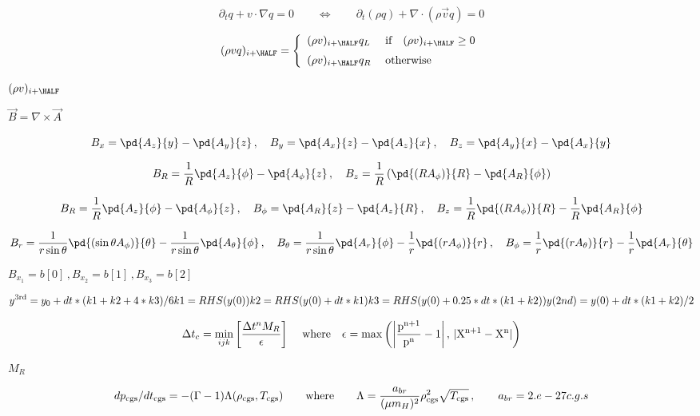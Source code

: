 \documentclass{article}
\begin{document}
\[ \partial_tq + v\cdot \nabla q = 0 
    \qquad\Longleftrightarrow\qquad
    \partial_t(\rho q) + \nabla\cdot(\rho\vec{v}q) = 0 
\]
\pagebreak

\[  (\rho vq)_{i+\HALF} = \left\{\begin{array}{ll}
  (\rho v)_{i+\HALF}q_L & \;\textrm{if} 
         \quad (\rho v)_{i+\HALF} \ge 0 \\ \noalign{\medskip}
  (\rho v)_{i+\HALF}q_R & \; \textrm{otherwise}  
 \end{array}\right.
\]
\pagebreak

$ (\rho v)_{i+\HALF}$
\pagebreak

$ \vec{B} = \nabla\times\vec{A} $
\pagebreak

\[  B_x = \pd{A_z}{y} - \pd{A_y}{z} \,,\quad
  B_y = \pd{A_x}{z} - \pd{A_z}{x} \,,\quad
  B_z = \pd{A_y}{x} - \pd{A_x}{y}
\]
\pagebreak

\[   B_R = \frac{1}{R}\pd{A_z}{\phi}    - \pd{A_\phi}{z}      \,,\quad
   B_z = \frac{1}{R}\left(\pd{(RA_\phi)}{R} - \pd{A_R}{\phi}\right)
\]
\pagebreak

\[  B_R    = \frac{1}{R}\pd{A_z}{\phi} - \pd{A_\phi}{z}  \,,\quad
  B_\phi = \pd{A_R}{z} - \pd{A_z}{R}             \,,\quad
  B_z    = \frac{1}{R}\pd{(RA_\phi)}{R} - \frac{1}{R}\pd{A_R}{\phi}
\]
\pagebreak

\[  B_r      =   \frac{1}{r\sin\theta}\pd{(\sin\theta A_\phi)}{\theta} 
             - \frac{1}{r\sin\theta}\pd{A_\theta}{\phi}           \,,\quad
  B_\theta =   \frac{1}{r\sin\theta}\pd{A_r}{\phi} 
             - \frac{1}{r}\pd{(rA_\phi)}{r}                         \,,\quad
  B_\phi   =   \frac{1}{r}\pd{(rA_\theta)}{r}                  
             - \frac{1}{r}\pd{A_r}{\theta}
\]
\pagebreak

$ B_{x_1} = b[0]\,, B_{x_2} = b[1]\,, B_{x_3} = b[2] $
\pagebreak

\[  y^{\rm 3rd} = y_0 + dt*(k1 + k2 + 4*k3)/6

  k1 = RHS(y(0))
  k2 = RHS(y(0) + dt*k1)
  k3 = RHS(y(0) + 0.25*dt*(k1 + k2))

  y(2nd) = y(0) + dt*(k1 + k2)/2
\]
\pagebreak

\[   \Delta t_c = \min_{ijk}\left[\frac{\Delta t^n M_R}{\epsilon}\right]
   \,\quad\rm{where}\quad
   \epsilon = \max\left(\left|\frac{p^{n+1}}{p^n} - 1\right|,\,
              |X^{n+1}-X^n|\right)
\]
\pagebreak

$ M_R $
\pagebreak

\[     dp_{\rm cgs}/dt_{\rm cgs}
    = -(\Gamma - 1) \Lambda(\rho_{\rm cgs}, T_{\rm cgs})
     \qquad{\rm where}\qquad
     \Lambda = \frac{a_{br}}{(\mu m_H)^2} \rho_{\rm cgs}^2 \sqrt{T_{\rm cgs}}
    \,,\qquad
       a_{br} = 2.e-27   c.g.s
\]
\pagebreak
\end{document}
